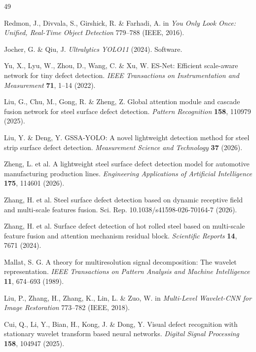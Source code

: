 \documentclass[pdflatex,sn-nature]{sn-jnl}
\begin{document}
\begin{thebibliography}{49}

Redmon, J., Divvala, S., Girshick, R. \& Farhadi, A. in \textit{You Only Look Once: Unified, Real-Time Object Detection} 779--788 (IEEE, 2016).

Jocher, G. \& Qiu, J. \textit{Ultralytics YOLO11} (2024). Software.

Yu, X., Lyu, W., Zhou, D., Wang, C. \& Xu, W. ES-Net: Efficient scale-aware network for tiny defect detection. \textit{IEEE Transactions on Instrumentation and Measurement} \textbf{71}, 1--14 (2022).

Liu, G., Chu, M., Gong, R. \& Zheng, Z. Global attention module and cascade fusion network for steel surface defect detection. \textit{Pattern Recognition} \textbf{158}, 110979 (2025).

Liu, Y. \& Deng, Y. GSSA-YOLO: A novel lightweight detection method for steel strip surface defect detection. \textit{Measurement Science and Technology} \textbf{37} (2026).

Zheng, L. et al. A lightweight steel surface defect detection model for automotive manufacturing production lines. \textit{Engineering Applications of Artificial Intelligence} \textbf{175}, 114601 (2026).

Zhang, H. et al. Steel surface defect detection based on dynamic receptive field
and multi-scale features fusion. Sci. Rep. 10.1038/s41598-026-70164-7 (2026).

Zhang, H. et al. Surface defect detection of hot rolled steel based on multi-scale feature fusion and attention mechanism residual block. \textit{Scientific Reports} \textbf{14}, 7671 (2024).

Mallat, S. G. A theory for multiresolution signal decomposition: The wavelet representation. \textit{IEEE Transactions on Pattern Analysis and Machine Intelligence} \textbf{11}, 674--693 (1989).

Liu, P., Zhang, H., Zhang, K., Lin, L. \& Zuo, W. in \textit{Multi-Level Wavelet-CNN for Image Restoration} 773--782 (IEEE, 2018).

Cui, Q., Li, Y., Bian, H., Kong, J. \& Dong, Y. Visual defect recognition with stationary wavelet transform based neural networks. \textit{Digital Signal Processing} \textbf{158}, 104947 (2025).


\end{thebibliography}
\end{document}
